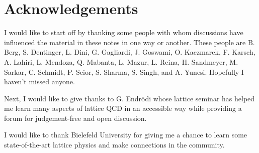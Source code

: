 \documentclass[12pt]{book}
\theoremstyle{definition}
\newenvironment{frontstuff}
  {\centering\chapter*{}}
  {\clearpage}
\begin{document}
\begin{frontstuff}


\end{frontstuff} %


\chapter{Acknowledgements}

I would like to start off by thanking some people with whom discussions
have influenced the material in these notes in one way or another.
These people are
B. Berg,
S. Dentinger,
L. Dini,
G. Gagliardi,
J. Goswami,
O. Kaczmarek,
F. Karsch,
A. Lahiri,
L. Mendoza,
Q. Mabanta,
L. Mazur,
L. Reina,
H. Sandmeyer,
M. Sarkar,
C. Schmidt,
P. Scior,
S. Sharma,
S. Singh,
and
A. Yunesi.
Hopefully I haven't missed anyone.

Next, I would like to give thanks to G. Endr\"odi whose lattice seminar
has helped me learn many aspects of lattice QCD in an accessible way while
providing a forum for judgement-free and open discussion.

I would like to thank Bielefeld University for giving me a chance to learn some
state-of-the-art lattice physics and make connections in the community.
\end{document}
